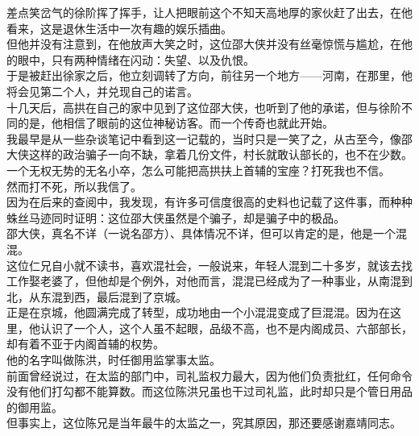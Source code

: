 \begin{multicols}{\theparacolNo}
差点笑岔气的徐阶挥了挥手，让人把眼前这个不知天高地厚的家伙赶了出去，在他看来，这是退休生活中一次有趣的娱乐插曲。\\

但他并没有注意到，在他放声大笑之时，这位邵大侠并没有丝毫惊慌与尴尬，在他的眼中，只有两种情绪在闪动：失望、以及仇恨。\\

于是被赶出徐家之后，他立刻调转了方向，前往另一个地方——河南，在那里，他将会见第二个人，并兑现自己的诺言。\\

十几天后，高拱在自己的家中见到了这位邵大侠，也听到了他的承诺，但与徐阶不同的是，他相信了眼前的这位神秘访客。而一个传奇也就此开始。\\

我最早是从一些杂谈笔记中看到这一记载的，当时只是一笑了之，从古至今，像邵大侠这样的政治骗子一向不缺，拿着几份文件，村长就敢认部长的，也不在少数。\\

一个无权无势的无名小卒，怎么可能把高拱扶上首辅的宝座？打死我也不信。\\

然而打不死，所以我信了。\\

因为在后来的查阅中，我发现，有许多可信度很高的史料也记载了这件事，而种种蛛丝马迹同时证明：这位邵大侠虽然是个骗子，却是骗子中的极品。\\

邵大侠，真名不详（一说名邵方）、具体情况不详，但可以肯定的是，他是一个混混。\\

这位仁兄自小就不读书，喜欢混社会，一般说来，年轻人混到二十多岁，就该去找工作娶老婆了，但他却是个例外，对他而言，混混已经成为了一种事业，从南混到北，从东混到西，最后混到了京城。\\

正是在京城，他圆满完成了转型，成功地由一个小混混变成了巨混混。因为在这里，他认识了一个人，这个人虽不起眼，品级不高，也不是内阁成员、六部部长，却有着不亚于内阁首辅的权势。\\

他的名字叫做陈洪，时任御用监掌事太监。\\

前面曾经说过，在太监的部门中，司礼监权力最大，因为他们负责批红，任何命令没有他们打勾都不能算数。而这位陈洪兄虽也干过司礼监，此时却只是个管日用品的御用监。\\

但事实上，这位陈兄是当年最牛的太监之一，究其原因，那还要感谢嘉靖同志。\\


\end{multicols}
